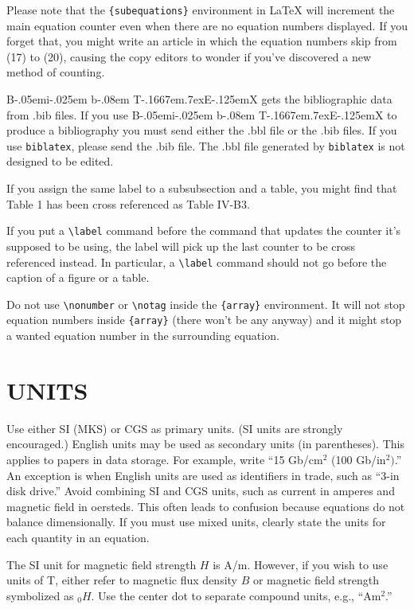 \documentclass{ieeetj}
\def\BibTeX{{\rm B\kern-.05em{\sc i\kern-.025em b}\kern-.08em
    T\kern-.1667em\lower.7ex\hbox{E}\kern-.125emX}}
\begin{document}
Please note that the \verb|{subequations}| environment in {\LaTeX}
will increment the main equation counter even when there are no
equation numbers displayed. If you forget that, you might write an
article in which the equation numbers skip from (17) to (20), causing
the copy editors to wonder if you've discovered a new method of
counting.

{\BibTeX} gets the bibliographic data from .bib files. If you use {\BibTeX} to produce a
bibliography you must send either the .bbl file or the .bib files.
If you use \texttt{biblatex}, please send the .bib file. The .bbl file
generated by \texttt{biblatex} is not designed to be edited.

If you assign the same label to a
subsubsection and a table, you might find that Table 1 has been cross
referenced as Table IV-B3.

If you put a
\verb|\label| command before the command that updates the counter it's
supposed to be using, the label will pick up the last counter to be
cross referenced instead. In particular, a \verb|\label| command
should not go before the caption of a figure or a table.

Do not use \verb|\nonumber| or \verb|\notag| inside the \verb|{array}| environment. It
will not stop equation numbers inside \verb|{array}| (there won't be
any anyway) and it might stop a wanted equation number in the
surrounding equation.

\section{UNITS}
Use either SI (MKS) or CGS as primary units. (SI units are strongly
encouraged.) English units may be used as secondary units (in parentheses).
This applies to papers in data storage. For example, write ``15 Gb/cm$^{2}$
(100 Gb/in$^{2})$.'' An exception is when English units are used as
identifiers in trade, such as ``3\textonehalf -in disk drive.'' Avoid
combining SI and CGS units, such as current in amperes and magnetic field in
oersteds. This often leads to confusion because equations do not balance
dimensionally. If you must use mixed units, clearly state the units for each
quantity in an equation.

The SI unit for magnetic field strength $H$ is A/m. However, if you wish to use
units of T, either refer to magnetic flux density $B$ or magnetic field
strength symbolized as \textmu $_{0}H$. Use the center dot to separate
compound units, e.g., ``A\textbullet m$^{2}$.''
\end{document}
